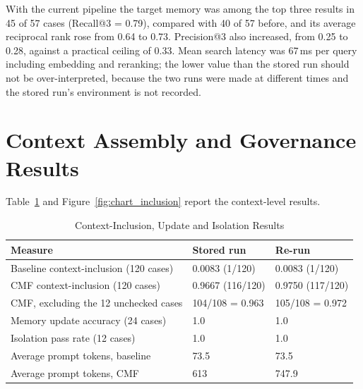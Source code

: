 With the current pipeline the target memory was among the top three results in 45 of 57
cases (Recall@3 = 0.79), compared with 40 of 57 before, and its average reciprocal rank
rose from 0.64 to 0.73. Precision@3 also increased, from 0.25 to 0.28, against a practical
ceiling of 0.33. Mean search latency was 67\,ms per query including embedding and reranking;
the lower value than the stored run should not be over-interpreted, because the two runs
were made at different times and the stored run's environment is not recorded.

\section{Context Assembly and Governance Results}
Table~\ref{tab:context_results} and Figure~\ref{fig:chart_inclusion} report the
context-level results.

\begin{table}[H]
    \centering
    \small
    \caption{Context-Inclusion, Update and Isolation Results}
    \begin{tabular}{p{6.4cm} p{3.0cm} p{3.0cm}}
        \toprule
        \textbf{Measure} & \textbf{Stored run} & \textbf{Re-run} \\
        \midrule
        Baseline context-inclusion (120 cases)      & 0.0083 (1/120) & 0.0083 (1/120) \\[3pt]
        CMF context-inclusion (120 cases)           & 0.9667 (116/120) & 0.9750 (117/120) \\[3pt]
        CMF, excluding the 12 unchecked cases       & 104/108 = 0.963 & 105/108 = 0.972 \\[3pt]
        Memory update accuracy (24 cases)           & 1.0 & 1.0 \\[3pt]
        Isolation pass rate (12 cases)              & 1.0 & 1.0 \\[3pt]
        Average prompt tokens, baseline             & 73.5 & 73.5 \\[3pt]
        Average prompt tokens, CMF                  & 613  & 747.9 \\
        \bottomrule
    \end{tabular}
    \label{tab:context_results}
\end{table}

\begin{figure}[H]
    \centering
\end{figure}


